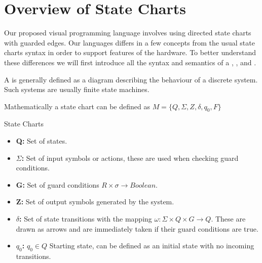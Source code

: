 \section{Overview of State Charts} \label{sec:overviewstatechart}

Our proposed visual programming language involves using directed state charts with guarded edges. Our languages differs in a few concepts from the usual state charts syntax in order to support features of the hardware. To better understand these differences we will first introduce all the syntax and semantics of a \cite{StateChartVis}, \cite{UML2}, and \cite{UML2}.

A \cite{StateChartVis} is generally defined as a diagram describing the behaviour of a discrete system. Such systems are usually finite state machines. 

Mathematically a state chart can be defined as $M = \lbrace Q, \Sigma, Z, \delta, q_0, F \rbrace$

\begin{definition}
State Charts

\label{def:statecharts}
\begin{itemize}
	\item \textbf{Q:} Set of states.
	\item \textbf{$\Sigma$:} Set of input symbols or actions, these are used when checking guard conditions.
	\item \textbf{G:} Set of guard conditions $R \times \sigma \rightarrow Boolean$.
	\item \textbf{Z:} Set of output symbols generated by the system.
	\item \textbf{$\delta$:} Set of state transitions with the mapping $\omega: \Sigma \times Q \times G \rightarrow Q$. These are drawn as arrows and are immediately taken if their guard conditions are true.
	\item \textbf{$q_0$:} $q_0 \in Q$ Starting state, can be defined as an initial state with no incoming transitions.
\end{itemize}
\end{definition}

